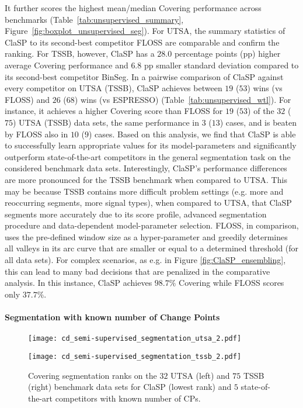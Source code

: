 \documentclass[pdflatex,sn-basic]{sn-jnl}
\begin{document}
It further scores the highest mean/median Covering performance across benchmarks (Table~\ref{tab:unsupervised_summary}, Figure~\ref{fig:boxplot_unsupervised_seg}). For UTSA, the summary statistics of ClaSP to its second-best competitor FLOSS are comparable and confirm the ranking. For TSSB, however, ClaSP has a $28.0$ percentage points (pp) higher average Covering performance and $6.8$ pp smaller standard deviation compared to its second-best competitor BinSeg. In a pairwise comparison of ClaSP against every competitor on UTSA (TSSB), ClaSP achieves between $19$ ($53$) wins (vs FLOSS) and $26$ ($68$) wins (vs ESPRESSO) (Table~\ref{tab:unsupervised_wtl}). For instance, it achieves a higher Covering score than FLOSS for $19$ ($53$) of the $32$ ($75$) UTSA (TSSB) data sets, the same performance in $3$ ($13$) cases, and is beaten by FLOSS also in $10$ ($9$) cases. Based on this analysis, we find that ClaSP is able to successfully learn appropriate values for its model-parameters and significantly outperform state-of-the-art competitors in the general segmentation task on the considered benchmark data sets. Interestingly, ClaSP's performance differences are more pronounced for the TSSB benchmark when compared to UTSA. This may be because TSSB contains more difficult problem settings (e.g. more and reoccurring segments, more signal types), when compared to UTSA, that ClaSP segments more accurately due to its score profile,  advanced segmentation procedure and data-dependent model-parameter selection. FLOSS, in comparison, uses the pre-defined window size as a hyper-parameter and greedily determines all valleys in its arc curve that are smaller or equal to a determined threshold (for all data sets). For complex scenarios, as e.g. in Figure \ref{fig:ClaSP_ensembling}, this can lead to many bad decisions that are penalized in the comparative analysis. In this instance, ClaSP achieves $98.7\%$ Covering while FLOSS scores only $37.7\%$.

\paragraph{Segmentation with known number of Change Points}

\begin{figure}[t]
	\begin{minipage}{6cm}
        \texttt{[image: cd\_semi-supervised\_segmentation\_utsa\_2.pdf]}
	\end{minipage}
	\begin{minipage}{6cm}
        \texttt{[image: cd\_semi-supervised\_segmentation\_tssb\_2.pdf]}
	\end{minipage}
	\caption{Covering segmentation ranks on the $32$ UTSA (left) and $75$ TSSB (right) benchmark data sets for ClaSP (lowest rank) and $5$ state-of-the-art competitors with known number of CPs.\label{fig:cd_semi-supervised_seg}
	}
\end{figure}
\end{document}
